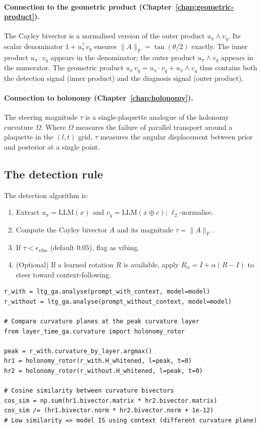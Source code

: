 \documentclass[11pt, twoside, openright]{memoir}
\newcommand{\gp}{\,}              %
\newcommand{\ip}{\cdot}           %
\newcommand{\op}{\wedge}          %
\begin{document}
\paragraph{Connection to the geometric product (Chapter~\ref{chap:geometric-product}).}
The Cayley bivector is a normalised version of the outer product
$u_\pi \op v_q$.  Its scalar denominator $1 + u_\pi^\top v_q$ ensures
$\|A\|_F = \tan(\theta/2)$ exactly.  The inner product
$u_\pi \ip v_q$ appears in the denominator; the outer product
$u_\pi \op v_q$ appears in the numerator.  The geometric product
$u_\pi \gp v_q = u_\pi \ip v_q + u_\pi \op v_q$ thus contains both
the detection signal (inner product) and the diagnosis signal (outer
product).

\paragraph{Connection to holonomy (Chapter~\ref{chap:holonomy}).}
The steering magnitude $\tau$ is a single-plaquette analogue of the
holonomy curvature $\Omega$.  Where $\Omega$ measures the failure of
parallel transport around a plaquette in the $(l, t)$ grid, $\tau$
measures the angular displacement between prior and posterior at a
single point.

\subsection{The detection rule}

The detection algorithm is:
\begin{enumerate}[nosep]
\item Extract $u_\pi = \text{LLM}(x)$ and
  $v_q = \text{LLM}(x \oplus c)$; $\ell_2$-normalise.
\item Compute the Cayley bivector $A$ and its magnitude
  $\tau = \|A\|_F$.
\item If $\tau < \epsilon_{\text{vibe}}$ (default $0.05$),
  flag as vibing.
\item (Optional) If a learned rotation $R$ is available, apply
  $R_\alpha = I + \alpha(R - I)$ to steer toward context-following.
\end{enumerate}

\begin{lstlisting}[caption={Context-ignoring detection via the Cayley bivector}]
r_with = ltg_ga.analyse(prompt_with_context, model=model)
r_without = ltg_ga.analyse(prompt_without_context, model=model)

# Compare curvature planes at the peak curvature layer
from layer_time_ga.curvature import holonomy_rotor

peak = r_with.curvature_by_layer.argmax()
hr1 = holonomy_rotor(r_with.H_whitened, l=peak, t=0)
hr2 = holonomy_rotor(r_without.H_whitened, l=peak, t=0)

# Cosine similarity between curvature bivectors
cos_sim = np.sum(hr1.bivector.matrix * hr2.bivector.matrix)
cos_sim /= (hr1.bivector.norm * hr2.bivector.norm + 1e-12)
# Low similarity => model IS using context (different curvature plane)
\end{lstlisting}
\end{document}
